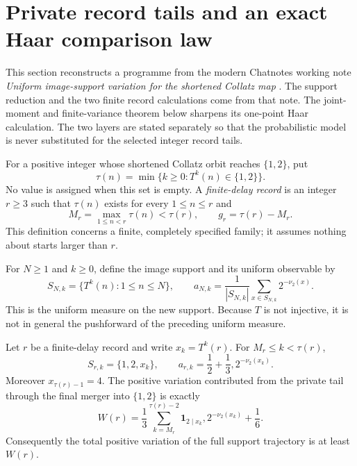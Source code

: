 \section{Private record tails and an exact Haar comparison law}
\label{sec:record-tail}

This section reconstructs a programme from the modern Chatnotes working note
\emph{Uniform image-support variation for the shortened Collatz map}
\cite{KokunoRecordTailNotes}.  The support reduction and the two finite record
calculations come from that note.  The joint-moment and finite-variance theorem
below sharpens its one-point Haar calculation.  The two layers are stated
separately so that the probabilistic model is never substituted for the
selected integer record tails.

For a positive integer whose shortened Collatz orbit reaches $\{1,2\}$, put
\[
 \tau(n)=\min\{k\ge0:T^k(n)\in\{1,2\}\}.
\]
No value is assigned when this set is empty.  A \emph{finite-delay record} is
an integer $r\ge3$ such that $\tau(n)$ exists for every $1\le n\le r$ and
\[
 M_r=\max_{1\le n<r}\tau(n)<\tau(r),
 \qquad g_r=\tau(r)-M_r.
 \tag{4.1}\label{eq:record-gap}
\]
This definition concerns a finite, completely specified family; it assumes
nothing about starts larger than $r$.

For $N\ge1$ and $k\ge0$, define the image support and its uniform observable
by
\[
 S_{N,k}=\{T^k(n):1\le n\le N\},
 \qquad
 a_{N,k}=\frac1{|S_{N,k}|}\sum_{x\in S_{N,k}}2^{-\nu_2(x)}.
 \tag{4.2}\label{eq:support-observable}
\]
This is the uniform measure on the new support.  Because $T$ is not
injective, it is not in general the pushforward of the preceding uniform
measure.

\begin{theorem}
\label{thm:record-tail-reduction}
Let $r$ be a finite-delay record and write $x_k=T^k(r)$.  For
$M_r\le k<\tau(r)$,
\begin{equation}
 S_{r,k}=\{1,2,x_k\},
 \qquad
 a_{r,k}=\frac12+\frac13,2^{-\nu_2(x_k)}.
 \label{eq:private-support}
\end{equation}
Moreover $x_{\tau(r)-1}=4$.  The positive variation contributed from the
private tail through the final merger into $\{1,2\}$ is exactly
\begin{equation}
 W(r)=\frac13\sum_{k=M_r}^{\tau(r)-2}
       \mathbf 1_{2\mid x_k},2^{-\nu_2(x_k)}+\frac16.
 \label{eq:private-tail-variation}
\end{equation}
Consequently the total positive variation of the full support trajectory is
at least $W(r)$.
\end{theorem}

